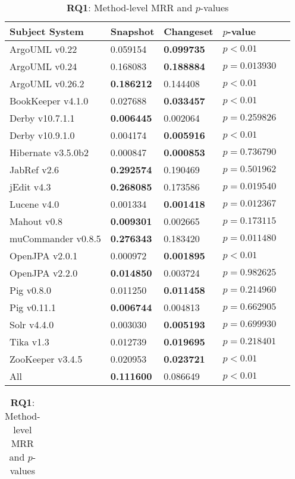 \begin{table}[t]
\renewcommand{\arraystretch}{1.3}
\footnotesize
\centering
\caption{{\bf RQ1}: Class-level MRR and $p$-values}
\begin{tabular}{l|ll|ll}
\toprule
Subject System & Snapshot & Changeset & $p$-value  \\
\midrule
ArgoUML v0.22 & 0.059154 & {\bf 0.099735 } & $p < 0.01$ \\
ArgoUML v0.24 & 0.168083 & {\bf 0.188884 } & $p = 0.013930$ \\
ArgoUML v0.26.2 & {\bf 0.186212 } & 0.144408 & $p < 0.01$ \\
BookKeeper v4.1.0 & 0.027688 & {\bf 0.033457 } & $p < 0.01$ \\
Derby v10.7.1.1 & {\bf 0.006445 } & 0.002064 & $p = 0.259826$ \\
Derby v10.9.1.0 & 0.004174 & {\bf 0.005916 } & $p < 0.01$ \\
Hibernate v3.5.0b2 & 0.000847 & {\bf 0.000853 } & $p = 0.736790$ \\
JabRef v2.6 & {\bf 0.292574 } & 0.190469 & $p = 0.501962$ \\
jEdit v4.3 & {\bf 0.268085 } & 0.173586 & $p = 0.019540$ \\
Lucene v4.0 & 0.001334 & {\bf 0.001418 } & $p = 0.012367$ \\
Mahout v0.8 & {\bf 0.009301 } & 0.002665 & $p = 0.173115$ \\
muCommander v0.8.5 & {\bf 0.276343 } & 0.183420 & $p = 0.011480$ \\
OpenJPA v2.0.1 & 0.000972 & {\bf 0.001895 } & $p < 0.01$ \\
OpenJPA v2.2.0 & {\bf 0.014850 } & 0.003724 & $p = 0.982625$ \\
Pig v0.8.0 & 0.011250 & {\bf 0.011458 } & $p = 0.214960$ \\
Pig v0.11.1 & {\bf 0.006744 } & 0.004813 & $p = 0.662905$ \\
Solr v4.4.0 & 0.003030 & {\bf 0.005193 } & $p = 0.699930$ \\
Tika v1.3 & 0.012739 & {\bf 0.019695 } & $p = 0.218401$ \\
ZooKeeper v3.4.5 & 0.020953 & {\bf 0.023721 } & $p < 0.01$ \\
\midrule
All & {\bf 0.111600 } & 0.086649 & $p < 0.01$ \\
\bottomrule
\end{tabular}
\vspace*{3mm}
\label{table:rq1:class:lda}
\caption{{\bf RQ1}: Method-level MRR and $p$-values}
\begin{tabular}{l|ll|ll}

\end{tabular}
\end{table}
